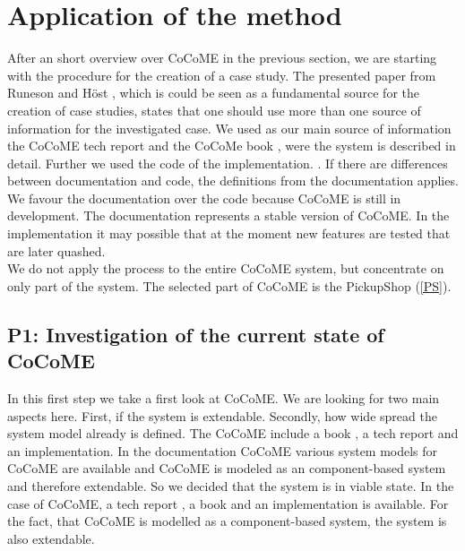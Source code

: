 \section{Application of the method}
\label{apllMethod}
After an short overview over CoCoME in the previous section, we are starting with the procedure for the creation of a case study. The presented paper from Runeson and H\"ost \cite{CaseStudySoftware}, which is could be seen as a fundamental source for the creation of case studies, states that one should use more than one source of information for the investigated case. We used as our main source of information the CoCoME tech report \cite{CoCoMETechReport} and the CoCoMe book \cite{CoCoMEBook}, were the system is described in detail. Further we used the code of the implementation.
. If there are differences between documentation and code, the definitions from the documentation applies. We favour the documentation over the code because CoCoME is still in development. The documentation represents a stable version of CoCoME. In the implementation it may possible that at the moment new features are tested that are later quashed.\\  We do not apply the process to the entire CoCoME system, but concentrate on only part of the system. The selected part of CoCoME is the PickupShop (\autoref{PS}).
\subsection{P1: Investigation of the current state of CoCoME}
In this first step we take a first look at CoCoME. We are looking for two main aspects here. First, if the system is extendable. Secondly, how wide spread the system model already is defined. The CoCoME include a book \cite{CoCoMEBook}, a tech report \cite{CoCoMETechReport} and an implementation. In the documentation CoCoME various system models for CoCoME are available and CoCoME is modeled as an component-based system and therefore extendable. So we decided that the system is in viable state.%
In the case of CoCoME, a tech report \cite{CoCoMETechReport}, a book \cite{CoCoMEBook} and an implementation is available. For the fact, that CoCoME is modelled as a component-based system, the system is also  extendable.
